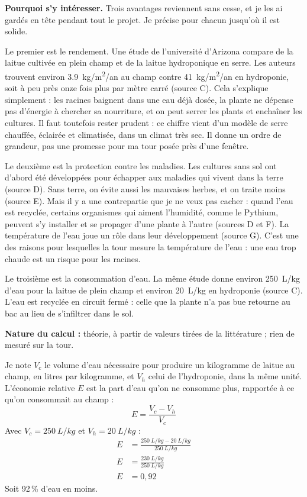 \documentclass[11pt,a4paper]{article}
\newcommand{\naturecalc}[2][7]{\par\Needspace{#1\baselineskip}\medskip\noindent\textbf{Nature du calcul :} #2.\par\nopagebreak}
\begin{document}
\textbf{Pourquoi s'y intéresser.} Trois avantages reviennent sans cesse, et je les ai gardés en tête pendant tout le projet. Je précise pour chacun jusqu'où il est solide.

Le premier est le rendement. Une étude de l'université d'Arizona compare de la laitue cultivée en plein champ et de la laitue hydroponique en serre. Les auteurs trouvent environ \qty{3,9}{kg/m^2/an} au champ contre \qty{41}{kg/m^2/an} en hydroponie, soit à peu près onze fois plus par mètre carré (source C). Cela s'explique simplement : les racines baignent dans une eau déjà dosée, la plante ne dépense pas d'énergie à chercher sa nourriture, et on peut serrer les plants et enchaîner les cultures. Il faut toutefois rester prudent : ce chiffre vient d'un modèle de serre chauffée, éclairée et climatisée, dans un climat très sec. Il donne un ordre de grandeur, pas une promesse pour ma tour posée près d'une fenêtre.

Le deuxième est la protection contre les maladies. Les cultures sans sol ont d'abord été développées pour échapper aux maladies qui vivent dans la terre (source D). Sans terre, on évite aussi les mauvaises herbes, et on traite moins (source E). Mais il y a une contrepartie que je ne veux pas cacher : quand l'eau est recyclée, certains organismes qui aiment l'humidité, comme le Pythium, peuvent s'y installer et se propager d'une plante à l'autre (sources D et F). La température de l'eau joue un rôle dans leur développement (source G). C'est une des raisons pour lesquelles la tour mesure la température de l'eau : une eau trop chaude est un risque pour les racines.

Le troisième est la consommation d'eau. La même étude donne environ \qty{250}{L/kg} d'eau pour la laitue de plein champ et environ \qty{20}{L/kg} en hydroponie (source C). L'eau est recyclée en circuit fermé : celle que la plante n'a pas bue retourne au bac au lieu de s'infiltrer dans le sol.

\naturecalc{théorie, à partir de valeurs tirées de la littérature ; rien de mesuré sur la tour}
\begin{demonstration}
Je note $V_c$ le volume d'eau nécessaire pour produire un kilogramme de laitue au champ, en litres par kilogramme, et $V_h$ celui de l'hydroponie, dans la même unité. L'économie relative $E$ est la part d'eau qu'on ne consomme plus, rapportée à ce qu'on consommait au champ :
\[
E = \frac{V_c - V_h}{V_c}
\]
Avec $V_c = \qty{250}{L/kg}$ et $V_h = \qty{20}{L/kg}$ :
\begin{align*}
E &= \frac{\qty{250}{L/kg} - \qty{20}{L/kg}}{\qty{250}{L/kg}}\\
E &= \frac{\qty{230}{L/kg}}{\qty{250}{L/kg}}\\
E &= 0{,}92
\end{align*}
Soit \num{92}\,\% d'eau en moins.
\end{demonstration}
\end{document}
